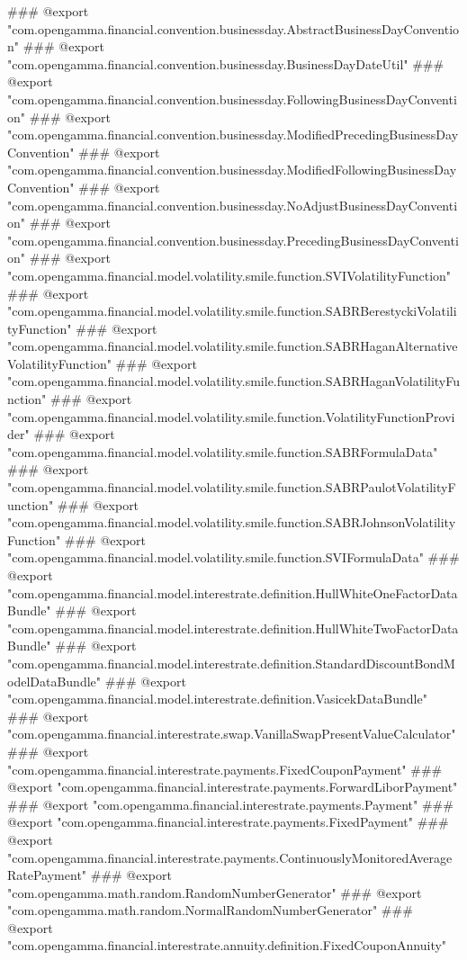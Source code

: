 ### @export "com.opengamma.financial.convention.businessday.AbstractBusinessDayConvention"
### @export "com.opengamma.financial.convention.businessday.BusinessDayDateUtil"
### @export "com.opengamma.financial.convention.businessday.FollowingBusinessDayConvention"
### @export "com.opengamma.financial.convention.businessday.ModifiedPrecedingBusinessDayConvention"
### @export "com.opengamma.financial.convention.businessday.ModifiedFollowingBusinessDayConvention"
### @export "com.opengamma.financial.convention.businessday.NoAdjustBusinessDayConvention"
### @export "com.opengamma.financial.convention.businessday.PrecedingBusinessDayConvention"
### @export "com.opengamma.financial.model.volatility.smile.function.SVIVolatilityFunction"
### @export "com.opengamma.financial.model.volatility.smile.function.SABRBerestyckiVolatilityFunction"
### @export "com.opengamma.financial.model.volatility.smile.function.SABRHaganAlternativeVolatilityFunction"
### @export "com.opengamma.financial.model.volatility.smile.function.SABRHaganVolatilityFunction"
### @export "com.opengamma.financial.model.volatility.smile.function.VolatilityFunctionProvider"
### @export "com.opengamma.financial.model.volatility.smile.function.SABRFormulaData"
### @export "com.opengamma.financial.model.volatility.smile.function.SABRPaulotVolatilityFunction"
### @export "com.opengamma.financial.model.volatility.smile.function.SABRJohnsonVolatilityFunction"
### @export "com.opengamma.financial.model.volatility.smile.function.SVIFormulaData"
### @export "com.opengamma.financial.model.interestrate.definition.HullWhiteOneFactorDataBundle"
### @export "com.opengamma.financial.model.interestrate.definition.HullWhiteTwoFactorDataBundle"
### @export "com.opengamma.financial.model.interestrate.definition.StandardDiscountBondModelDataBundle"
### @export "com.opengamma.financial.model.interestrate.definition.VasicekDataBundle"
### @export "com.opengamma.financial.interestrate.swap.VanillaSwapPresentValueCalculator"
### @export "com.opengamma.financial.interestrate.payments.FixedCouponPayment"
### @export "com.opengamma.financial.interestrate.payments.ForwardLiborPayment"
### @export "com.opengamma.financial.interestrate.payments.Payment"
### @export "com.opengamma.financial.interestrate.payments.FixedPayment"
### @export "com.opengamma.financial.interestrate.payments.ContinuouslyMonitoredAverageRatePayment"
### @export "com.opengamma.math.random.RandomNumberGenerator"
### @export "com.opengamma.math.random.NormalRandomNumberGenerator"
### @export "com.opengamma.financial.interestrate.annuity.definition.FixedCouponAnnuity"
